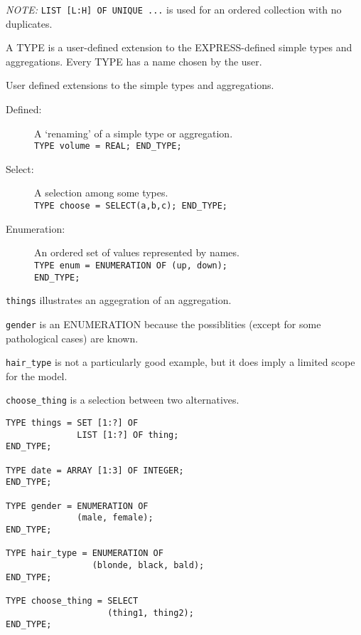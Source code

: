 \emph{NOTE:} \verb?LIST [L:H] OF UNIQUE ...? is used for an ordered collection
with no duplicates.


\begin{remarks}
\remintro
{}

    A TYPE is a user-defined extension to the EXPRESS-defined simple types
and aggregations. Every TYPE has a name chosen by the user.

\remend
\end{remarks}


    User defined extensions to the simple types and aggregations.

\begin{description}
\item[Defined:] A `renaming' of a simple type or aggregation.\\
  \verb|TYPE volume = REAL; END_TYPE;|
\item[Select:] A selection among some types. \\
  \verb|TYPE choose = SELECT(a,b,c); END_TYPE;|
\item[Enumeration:] An ordered set of values represented by names. \\
  \verb|TYPE enum = ENUMERATION OF (up, down);| \\
  \verb|END_TYPE;| 
\end{description}


\begin{remarks}
\remintro
{}

\texttt{things} illustrates an aggegration of an aggregation.

\texttt{gender} is an ENUMERATION because the possiblities (except for some
pathological cases) are known.

\texttt{hair\_type} is not a particularly good example, but it does imply 
a limited scope for the model.

\texttt{choose\_thing} is a selection between two alternatives.

\remend
\end{remarks}


\begin{verbatim}
TYPE things = SET [1:?] OF 
              LIST [1:?] OF thing;
END_TYPE;

TYPE date = ARRAY [1:3] OF INTEGER;
END_TYPE;

TYPE gender = ENUMERATION OF 
              (male, female);
END_TYPE;

TYPE hair_type = ENUMERATION OF 
                 (blonde, black, bald);
END_TYPE;
 
TYPE choose_thing = SELECT 
                    (thing1, thing2);
END_TYPE;
\end{verbatim}


